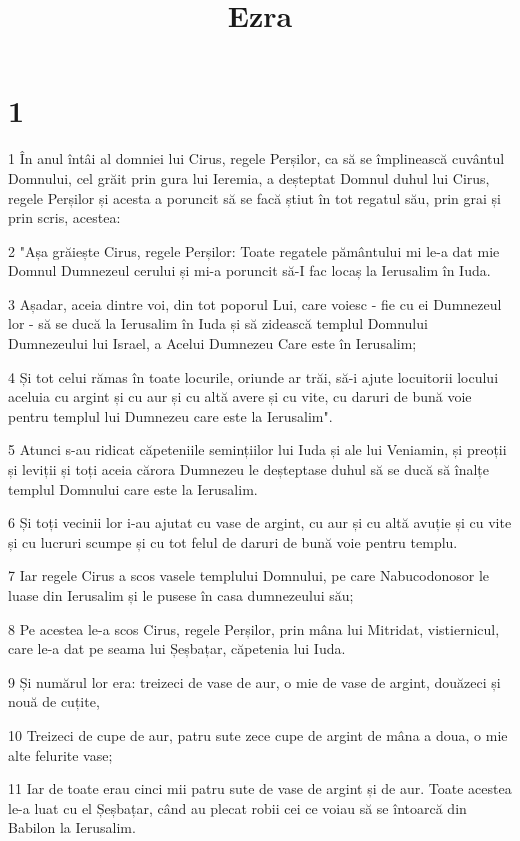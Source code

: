 

\title{Ezra}


\chapter{1}

\par 1 În anul întâi al domniei lui Cirus, regele Perșilor, ca să se împlinească cuvântul Domnului, cel grăit prin gura lui Ieremia, a deșteptat Domnul duhul lui Cirus, regele Perșilor și acesta a poruncit să se facă știut în tot regatul său, prin grai și prin scris, acestea:
\par 2 "Așa grăiește Cirus, regele Perșilor: Toate regatele pământului mi le-a dat mie Domnul Dumnezeul cerului și mi-a poruncit să-I fac locaș la Ierusalim în Iuda.
\par 3 Așadar, aceia dintre voi, din tot poporul Lui, care voiesc - fie cu ei Dumnezeul lor - să se ducă la Ierusalim în Iuda și să zidească templul Domnului Dumnezeului lui Israel, a Acelui Dumnezeu Care este în Ierusalim;
\par 4 Și tot celui rămas în toate locurile, oriunde ar trăi, să-i ajute locuitorii locului aceluia cu argint și cu aur și cu altă avere și cu vite, cu daruri de bună voie pentru templul lui Dumnezeu care este la Ierusalim".
\par 5 Atunci s-au ridicat căpeteniile semințiilor lui Iuda și ale lui Veniamin, și preoții și leviții și toți aceia cărora Dumnezeu le deșteptase duhul să se ducă să înalțe templul Domnului care este la Ierusalim.
\par 6 Și toți vecinii lor i-au ajutat cu vase de argint, cu aur și cu altă avuție și cu vite și cu lucruri scumpe și cu tot felul de daruri de bună voie pentru templu.
\par 7 Iar regele Cirus a scos vasele templului Domnului, pe care Nabucodonosor le luase din Ierusalim și le pusese în casa dumnezeului său;
\par 8 Pe acestea le-a scos Cirus, regele Perșilor, prin mâna lui Mitridat, vistiernicul, care le-a dat pe seama lui Șeșbațar, căpetenia lui Iuda.
\par 9 Și numărul lor era: treizeci de vase de aur, o mie de vase de argint, douăzeci și nouă de cuțite,
\par 10 Treizeci de cupe de aur, patru sute zece cupe de argint de mâna a doua, o mie alte felurite vase;
\par 11 Iar de toate erau cinci mii patru sute de vase de argint și de aur. Toate acestea le-a luat cu el Șeșbațar, când au plecat robii cei ce voiau să se întoarcă din Babilon la Ierusalim.

